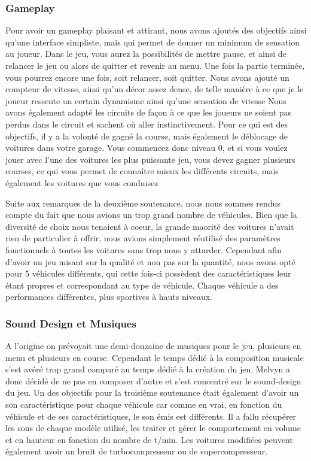 \documentclass[a4paper,12pt]{article}
\begin{document}
            \subsubsection{Gameplay}
            
            Pour avoir un gameplay plaisant et attirant, nous avons ajoutés des objectifs ainsi qu'une interface simpliste, mais qui permet de donner un minimum de sensation au joueur. Dans le jeu, vous aurez la possibilités de mettre pause, et ainsi de relancer le jeu ou alors de quitter et revenir au menu. Une fois la partie terminée, vous pourrez encore une fois, soit relancer, soit quitter. Nous avons ajouté un compteur de vitesse, ainsi qu'un décor assez dense, de telle manière à ce que je le joueur ressente un certain dynamisme ainsi qu'une sensation de vitesse Nous avons également adapté les circuits de façon à ce que les joueurs ne soient pas perdus dans le circuit et sachent où aller instinctivement. Pour ce qui est des objectifs, il y a la volonté de gagné la course, mais également le déblocage de voitures dans votre garage. Vous commencez donc niveau 0, et si vous voulez jouer avec l'une des voitures les plus puissante jeu, vous devez gagner plusieurs courses, ce qui vous permet de connaître mieux les différents circuits, mais également les voitures que vous conduisez   
            
            Suite aux remarques de la deuxième soutenance, nous nous sommes rendus compte du fait que nous avions un trop grand nombre de véhicules. Bien que la diversité de choix nous tenaient à coeur, la grande maorité des voitures n'avait rien de particulier à offrir, nous avions simplement réutilisé des paramètres fonctionnels à toutes les voitures sans trop nous y attarder. Cependant afin d'avoir un jeu misant sur la qualité et non pas sur la quantité, nous avons opté pour 5 véhicules différents, qui cette fois-ci possèdent des caractéristiques leur étant propres et correspondant au type de véhicule. Chaque véhicule a des performances différentes, plus sportives à hauts niveaux.
            
            \subsubsection{Sound Design et Musiques}
            
            A l'origine on prévoyait une demi-douzaine de musiques pour le jeu, plusieurs en menu et plusieurs en course. Cependant le temps dédié à la composition musicale s'est avéré trop grand comparé au temps dédié à la création du jeu. Melvyn a donc décidé de ne pas en composer d'autre et s'est concentré sur le sound-design du jeu. Un des objectifs pour la troisième soutenance était également d'avoir un son caractéristique pour chaque véhicule car comme en vrai, en fonction du véhicule et de ses caractéristiques, le son émis est différents. Il a fallu récupérer les sons de chaque modèle utilisé, les traiter et gérer le comportement en volume et en hauteur en fonction du nombre de t/min. Les voitures modifiées peuvent également avoir un bruit de turbocompresseur ou de supercompresseur.
            
\end{document}
